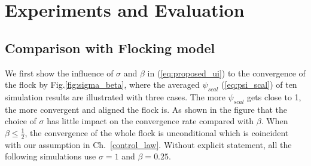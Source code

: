 \chapter{Experiments and Evaluation}\label{experiment}

\section{Comparison with Flocking model}

We first show the influence of $\sigma$ and $\beta$ in (\ref{eq:proposed_ui}) to the convergence of the flock by Fig.\ref{fig:sigma_beta}, where the averaged $\psi_{scal}$ (\ref{eq:psi_scal}) of ten simulation results are illustrated with three cases. The more $\psi_{scal}$ gets close to 1, the more convergent and aligned the flock is. As shown in the figure that the choice of $\sigma$ has little impact on the convergence rate compared with $\beta$. When $\beta\leq\frac{1}{2}$, the convergence of the whole flock is unconditional which is coincident with our assumption in Ch.~\ref{control_law}. Without explicit statement, all the following simulations use $\sigma=1$ and $\beta=0.25$.

